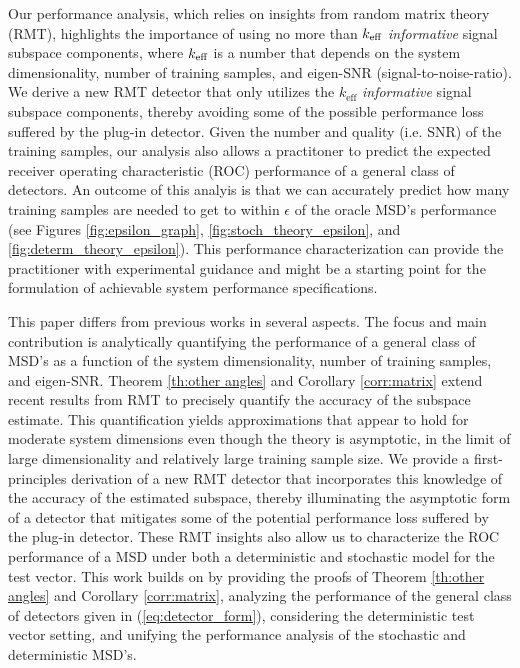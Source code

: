 Our performance analysis, which relies on insights from random matrix theory (RMT), highlights the importance of using no more than $k_\text{eff}$ \textit{informative} signal subspace components, where $k_\text{eff}$ is a number that depends on the system dimensionality, number of training samples, and eigen-SNR (signal-to-noise-ratio). We derive a new RMT detector that only utilizes the $k_\text{eff}$ \textit{informative} signal subspace components, thereby avoiding some of the possible performance loss suffered by the plug-in detector. Given the number and quality (i.e. SNR) of the training samples, our analysis also allows a practitoner to predict the expected receiver operating characteristic (ROC) performance of a general class of detectors. An outcome of this analyis is that we can accurately predict how many training samples are needed to get to within $\epsilon$ of the oracle MSD's performance (see Figures \ref{fig:epsilon_graph}, \ref{fig:stoch_theory_epsilon}, and \ref{fig:determ_theory_epsilon}). This performance characterization can provide the practitioner with experimental guidance and might be a starting point for the formulation of achievable system performance specifications.

This paper differs from previous works in several aspects. The focus and main contribution is analytically quantifying the performance of a general class of MSD's as a function of the system dimensionality, number of training samples, and eigen-SNR. Theorem \ref{th:other angles} and Corollary \ref{corr:matrix} extend recent results from RMT \cite{paul2007asymptotics,benaych2011eigenvalues, benaych2011singular} to precisely quantify the accuracy of the subspace estimate. This quantification yields approximations that appear to hold for moderate system dimensions even though the theory is asymptotic, in the limit of large dimensionality and relatively large training sample size. We provide a first-principles derivation of a new RMT detector that incorporates this knowledge of the accuracy of the estimated subspace, thereby illuminating the asymptotic form of a detector that mitigates some of the potential performance loss suffered by the plug-in detector. These RMT insights also allow us to characterize the ROC performance of a MSD under both a deterministic and stochastic model for the test vector. This work builds on \cite{asendorf2011msd} by providing the proofs of Theorem \ref{th:other angles} and Corollary \ref{corr:matrix}, analyzing the performance of the general class of detectors given in (\ref{eq:detector_form}), considering the deterministic test vector setting, and unifying the performance analysis of the stochastic and deterministic MSD's.

